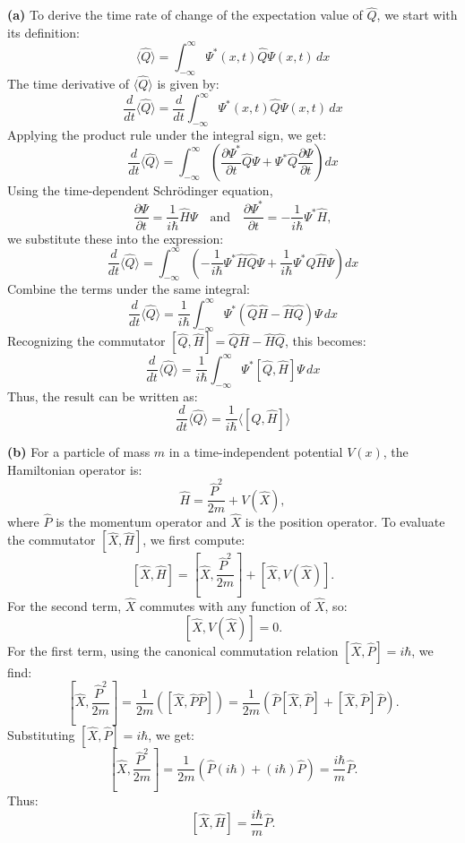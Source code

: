 \textbf{(a)} To derive the time rate of change of the expectation value of $\hat{Q}$, we start with its definition:
\[
\langle \hat{Q} \rangle = \int_{-\infty}^\infty \Psi^*(x, t) \hat{Q} \Psi(x, t) \, dx
\]
The time derivative of $\langle \hat{Q} \rangle$ is given by:
\[
\frac{d}{dt} \langle \hat{Q} \rangle = \frac{d}{dt} \int_{-\infty}^\infty \Psi^*(x, t) \hat{Q} \Psi(x, t) \, dx
\]
Applying the product rule under the integral sign, we get:
\[
\frac{d}{dt} \langle \hat{Q} \rangle = \int_{-\infty}^\infty \left( \frac{\partial \Psi^*}{\partial t} \hat{Q} \Psi + \Psi^* \hat{Q} \frac{\partial \Psi}{\partial t} \right) dx
\]
Using the time-dependent Schrödinger equation, 
\[
\frac{\partial \Psi}{\partial t} = \frac{1}{i\hbar} \hat{H} \Psi \quad \text{and} \quad \frac{\partial \Psi^*}{\partial t} = -\frac{1}{i\hbar} \Psi^* \hat{H},
\]
we substitute these into the expression:
\[
\frac{d}{dt} \langle \hat{Q} \rangle = \int_{-\infty}^\infty \left( -\frac{1}{i\hbar} \Psi^* \hat{H} \hat{Q} \Psi + \frac{1}{i\hbar} \Psi^* \hat{Q} \hat{H} \Psi \right) dx
\]
Combine the terms under the same integral:
\[
\frac{d}{dt} \langle \hat{Q} \rangle = \frac{1}{i\hbar} \int_{-\infty}^\infty \Psi^* \left( \hat{Q} \hat{H} - \hat{H} \hat{Q} \right) \Psi \, dx
\]
Recognizing the commutator $\left[ \hat{Q}, \hat{H} \right] = \hat{Q} \hat{H} - \hat{H} \hat{Q}$, this becomes:
\[
\frac{d}{dt} \langle \hat{Q} \rangle = \frac{1}{i\hbar} \int_{-\infty}^\infty \Psi^* \left[ \hat{Q}, \hat{H} \right] \Psi \, dx
\]
Thus, the result can be written as:
\[
\frac{d}{dt} \langle \hat{Q} \rangle = \frac{1}{i\hbar} \langle [\hat{Q}, \hat{H}] \rangle
\]

\textbf{(b)} For a particle of mass $m$ in a time-independent potential $V(x)$, the Hamiltonian operator is:
\[
\hat{H} = \frac{\hat{P}^2}{2m} + V(\hat{X}),
\]
where $\hat{P}$ is the momentum operator and $\hat{X}$ is the position operator. To evaluate the commutator $[\hat{X}, \hat{H}]$, we first compute:
\[
[\hat{X}, \hat{H}] = \left[\hat{X}, \frac{\hat{P}^2}{2m}\right] + \left[\hat{X}, V(\hat{X})\right].
\]
For the second term, $\hat{X}$ commutes with any function of $\hat{X}$, so:
\[
\left[\hat{X}, V(\hat{X})\right] = 0.
\]
For the first term, using the canonical commutation relation $[\hat{X}, \hat{P}] = i\hbar$, we find:
\[
\left[\hat{X}, \frac{\hat{P}^2}{2m}\right] = \frac{1}{2m} \left( [\hat{X}, \hat{P} \hat{P}] \right) = \frac{1}{2m} \left( \hat{P} [\hat{X}, \hat{P}] + [\hat{X}, \hat{P}] \hat{P} \right).
\]
Substituting $[\hat{X}, \hat{P}] = i\hbar$, we get:
\[
\left[\hat{X}, \frac{\hat{P}^2}{2m}\right] = \frac{1}{2m} \left( \hat{P} (i\hbar) + (i\hbar) \hat{P} \right) = \frac{i\hbar}{m} \hat{P}.
\]
Thus:
\[
[\hat{X}, \hat{H}] = \frac{i\hbar}{m} \hat{P}.
\]

